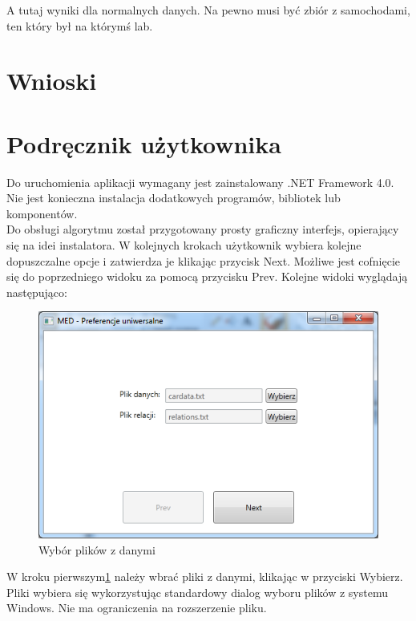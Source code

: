 \documentclass[a4paper,12pt]{article}
\begin{document}
A tutaj wyniki dla normalnych danych. Na pewno musi być zbiór z samochodami, ten który był na którymś lab.

\section{Wnioski}

\appendix
\section{Podręcznik użytkownika}

Do uruchomienia aplikacji wymagany jest zainstalowany .NET Framework 4.0. Nie jest konieczna instalacja dodatkowych programów, bibliotek lub komponentów.\\

Do obsługi algorytmu został przygotowany prosty graficzny interfejs, opierający
się na idei instalatora. W kolejnych krokach użytkownik wybiera kolejne dopuszczalne opcje i zatwierdza je klikając przycisk Next. Możliwe jest cofnięcie się do poprzedniego widoku za pomocą przycisku Prev. Kolejne widoki wyglądają następująco:

\begin{figure}[h!]
\begin{center}
\includegraphics[width=\textwidth]{img/1.png}
\caption{Wybór plików z danymi}
\label{krok1}
\end{center}
\end{figure}

W kroku pierwszym\ref{krok1} należy wbrać pliki z danymi, klikając w przyciski Wybierz. Pliki wybiera się wykorzystując standardowy dialog wyboru plików z systemu Windows. Nie ma ograniczenia na rozszerzenie pliku.\\
\end{document}
